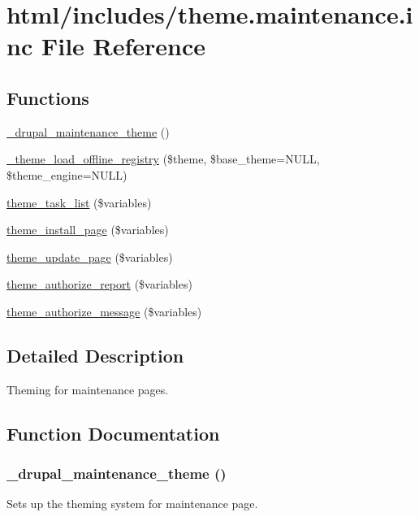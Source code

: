 \hypertarget{theme_8maintenance_8inc}{
\section{html/includes/theme.maintenance.inc File Reference}
\label{theme_8maintenance_8inc}
}
\subsection*{Functions}
\begin{DoxyCompactItemize}
\item 
\hyperlink{theme_8maintenance_8inc_a8f521a6aba04fc11935a874df3ad9f05}{\_\-drupal\_\-maintenance\_\-theme} ()
\item 
\hyperlink{theme_8maintenance_8inc_a7bf7a7faa37b3475038eca9a2ecf97e5}{\_\-theme\_\-load\_\-offline\_\-registry} (\$theme, \$base\_\-theme=NULL, \$theme\_\-engine=NULL)
\item 
\hyperlink{group__themeable_gacac34ad88b724d01c7ca68f7891f64db}{theme\_\-task\_\-list} (\$variables)
\item 
\hyperlink{theme_8maintenance_8inc_a7d807e760c99d03293eb438cbccbfefe}{theme\_\-install\_\-page} (\$variables)
\item 
\hyperlink{theme_8maintenance_8inc_a76bf88a41655c58542abe7c3d1c3cb39}{theme\_\-update\_\-page} (\$variables)
\item 
\hyperlink{group__themeable_gae1d7d2ad7f9c1e0be407bd99960811fd}{theme\_\-authorize\_\-report} (\$variables)
\item 
\hyperlink{group__themeable_ga56220e4ed7d88deb60333c0013ba72a6}{theme\_\-authorize\_\-message} (\$variables)
\end{DoxyCompactItemize}


\subsection{Detailed Description}
Theming for maintenance pages. 

\subsection{Function Documentation}
\hypertarget{theme_8maintenance_8inc_a8f521a6aba04fc11935a874df3ad9f05}{
\subsubsection[{\_\-drupal\_\-maintenance\_\-theme}]{\setlength{\rightskip}{0pt plus 5cm}\_\-drupal\_\-maintenance\_\-theme ()}}
\label{theme_8maintenance_8inc_a8f521a6aba04fc11935a874df3ad9f05}
Sets up the theming system for maintenance page.

